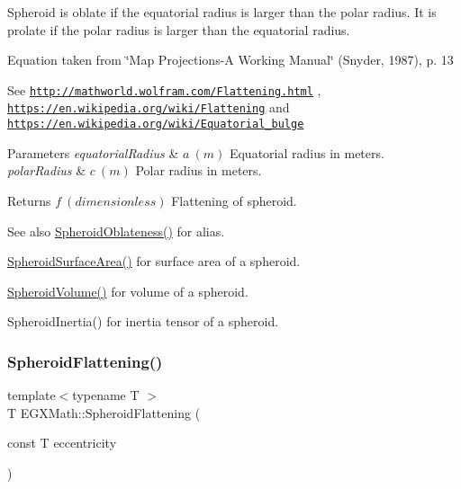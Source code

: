 Spheroid is oblate if the equatorial radius is larger than the polar radius. It is prolate if the polar radius is larger than the equatorial radius.

Equation taken from \char`\"{}\+Map Projections-\/\+A Working Manual\char`\"{} (Snyder, 1987), p. 13

See \href{http://mathworld.wolfram.com/Flattening.html}{\tt http\+://mathworld.\+wolfram.\+com/\+Flattening.\+html} , \href{https://en.wikipedia.org/wiki/Flattening}{\tt https\+://en.\+wikipedia.\+org/wiki/\+Flattening} and \href{https://en.wikipedia.org/wiki/Equatorial_bulge}{\tt https\+://en.\+wikipedia.\+org/wiki/\+Equatorial\+\_\+bulge} 
\begin{DoxyParams}{Parameters}
{\em equatorial\+Radius} & $ a\ (m)$ Equatorial radius in meters. \\
\hline
{\em polar\+Radius} & $ c\ (m)$ Polar radius in meters. \\
\hline
\end{DoxyParams}
\begin{DoxyReturn}{Returns}
$ f\ (dimensionless)$ Flattening of spheroid. 
\end{DoxyReturn}
\begin{DoxySeeAlso}{See also}
\mbox{\hyperlink{group___e_g_x_math-_geometry-3_d-_spheroid-_flattening_ga486adfc58b047197daf87f50b2039ca7}{Spheroid\+Oblateness()}} for alias. 

\mbox{\hyperlink{group___e_g_x_math-_geometry-3_d-_spheroid-_surface_area_ga32a21d075102ea9a235a43165675627e}{Spheroid\+Surface\+Area()}} for surface area of a spheroid. 

\mbox{\hyperlink{group___e_g_x_math-_geometry-3_d-_spheroid-_volume_gac89ed1e10e56c724b341591ecc5605dc}{Spheroid\+Volume()}} for volume of a spheroid. 

Spheroid\+Inertia() for inertia tensor of a spheroid. 
\end{DoxySeeAlso}
\mbox{\label{group___e_g_x_math-_geometry-3_d-_spheroid-_flattening_ga9822b6e1025edbf7d272949547c53511}} 
\subsubsection{\texorpdfstring{Spheroid\+Flattening()}{SpheroidFlattening()}\hspace{0.1cm}{\footnotesize\ttfamily [2/2]}}
{\footnotesize\ttfamily template$<$typename T $>$ \\
T E\+G\+X\+Math\+::\+Spheroid\+Flattening (\begin{DoxyParamCaption}\item[{const T}]{eccentricity }\end{DoxyParamCaption})}



